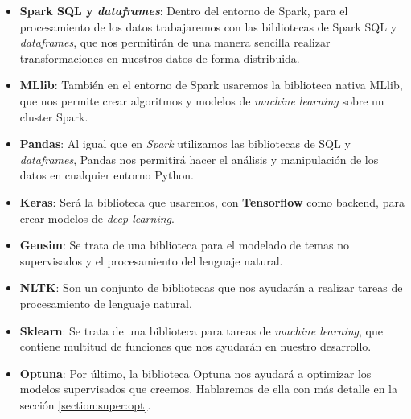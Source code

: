 \begin{itemize}
	

\item \textbf{Spark SQL y \textit{dataframes}}: Dentro del entorno de Spark, para el procesamiento de los datos trabajaremos con las bibliotecas de Spark SQL y \textit{dataframes}, que nos permitirán de una manera sencilla realizar transformaciones en nuestros datos de forma distribuida.
\item \textbf{MLlib}: También en el entorno de Spark usaremos la biblioteca nativa MLlib, que nos permite crear algoritmos y modelos de \textit{machine learning} sobre un cluster Spark.
\item \textbf{Pandas}: Al igual que en \textit{Spark} utilizamos las bibliotecas de SQL y \textit{dataframes}, Pandas nos permitirá hacer el análisis y manipulación de los datos en cualquier entorno Python.
\item \textbf{ Keras}: Será la biblioteca que usaremos, con  \textbf{Tensorflow} como backend, para crear modelos de \textit{deep learning}.

\item \textbf{Gensim}: Se trata de una biblioteca para el modelado de temas no supervisados y el procesamiento del lenguaje natural.

\item \textbf{NLTK}: Son un conjunto de bibliotecas que nos ayudarán a realizar tareas de procesamiento de lenguaje natural.
\item \textbf{Sklearn}: Se trata de una biblioteca para tareas de \textit{machine learning}, que contiene multitud de funciones que nos ayudarán en nuestro desarrollo.
	
	
\item \textbf{Optuna}:	 Por último, la biblioteca Optuna nos ayudará a optimizar los modelos supervisados que creemos. Hablaremos de ella con más detalle en la sección \ref{section:super:opt}.
	
	
\end{itemize}

